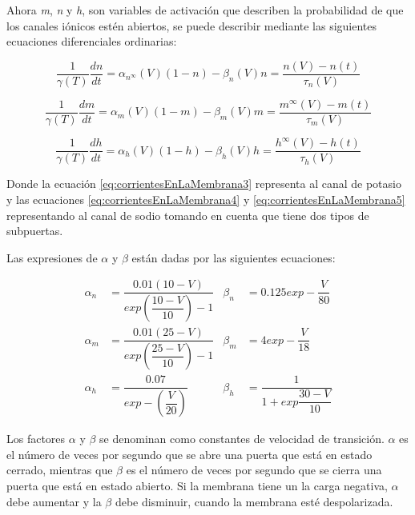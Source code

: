 Ahora \emph{m}, \emph{n} y \emph{h}, son variables de activación que describen la probabilidad de que los canales iónicos estén abiertos, se puede describir mediante las siguientes ecuaciones diferenciales ordinarias:

\begin{equation}
  \dfrac{1}{\gamma(T)}\dfrac{dn}{dt} =  \alpha_{n^\infty} (V)(1 - n) - \beta_{n} (V) n = \dfrac{n(V)-n(t)}{\tau_{n}(V)}
  \label{eq:corrientesEnLaMembrana3}
\end{equation}

\begin{equation}
  \dfrac{1}{\gamma(T)}\dfrac{dm}{dt} =  \alpha_{m} (V)(1 - m) - \beta_{m} (V) m = \dfrac{m^\infty(V)-m(t)}{\tau_{m}(V)}
  \label{eq:corrientesEnLaMembrana4}
\end{equation}

\begin{equation}
  \dfrac{1}{\gamma(T)}\dfrac{dh}{dt} =  \alpha_{h} (V)(1 - h) - \beta_{h} (V) h = \dfrac{h^\infty(V)-h(t)}{\tau_{h}(V)}
  \label{eq:corrientesEnLaMembrana5}
\end{equation}

Donde la ecuación \ref{eq:corrientesEnLaMembrana3} representa al canal de potasio y las ecuaciones \ref{eq:corrientesEnLaMembrana4} y \ref{eq:corrientesEnLaMembrana5} representando al canal de sodio tomando en cuenta que tiene dos tipos de subpuertas.

Las expresiones de \(\alpha\) y \(\beta\) están dadas por las siguientes ecuaciones:

\begin{align*}
\alpha_{n}&=\dfrac{0.01(10-V)}{exp(\dfrac{10-V}{10})-1}           &  \beta_{n}&=0.125exp-\dfrac{V}{80}\\
\alpha_{m}&=\dfrac{0.01(25-V)}{exp(\dfrac{25-V}{10})-1}                    &  \beta_{m}&=4exp-\dfrac{V}{18}\\
\alpha_{h}&=\dfrac{0.07}{exp-(\dfrac{V}{20})}              &  \beta_{h}&=\dfrac{1}{1+exp\dfrac{30-V}{10}}
\end{align*}

Los factores \(\alpha\) y \(\beta\) se denominan como constantes de velocidad de transición. \(\alpha\) es el número de veces por segundo que se abre una puerta que está en estado cerrado, mientras que \(\beta\) es el número de veces por segundo que se cierra una puerta que está en estado abierto. Si la membrana tiene un la carga negativa, \(\alpha\) debe aumentar y la \(\beta\) debe disminuir, cuando la membrana esté despolarizada.

